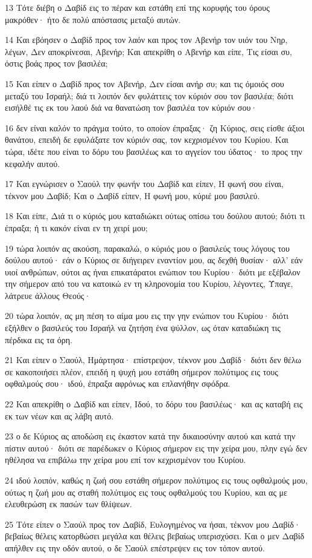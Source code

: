 \par 13 Τότε διέβη ο Δαβίδ εις το πέραν και εστάθη επί της κορυφής του όρους μακρόθεν· ήτο δε πολύ απόστασις μεταξύ αυτών.
\par 14 Και εβόησεν ο Δαβίδ προς τον λαόν και προς τον Αβενήρ τον υιόν του Νηρ, λέγων, Δεν αποκρίνεσαι, Αβενήρ; Και απεκρίθη ο Αβενήρ και είπε, Τις είσαι συ, όστις βοάς προς τον βασιλέα;
\par 15 Και είπεν ο Δαβίδ προς τον Αβενήρ, Δεν είσαι ανήρ συ; και τις όμοιός σου μεταξύ του Ισραήλ; διά τι λοιπόν δεν φυλάττεις τον κύριόν σου τον βασιλέα; διότι εισήλθέ τις εκ του λαού διά να θανατώση τον βασιλέα τον κύριόν σου·
\par 16 δεν είναι καλόν το πράγμα τούτο, το οποίον έπραξας· ζη Κύριος, σεις είσθε άξιοι θανάτου, επειδή δε εφυλάξατε τον κύριόν σας, τον κεχρισμένον του Κυρίου. Και τώρα, ιδέτε που είναι το δόρυ του βασιλέως και το αγγείον του ύδατος· το προς την κεφαλήν αυτού.
\par 17 Και εγνώρισεν ο Σαούλ την φωνήν του Δαβίδ και είπεν, Η φωνή σου είναι, τέκνον μου Δαβίδ; Και ο Δαβίδ είπεν, Η φωνή μου, κύριέ μου βασιλεύ.
\par 18 Και είπε, Διά τι ο κύριός μου καταδιώκει ούτως οπίσω του δούλου αυτού; διότι τι έπραξα; ή τι κακόν είναι εν τη χειρί μου;
\par 19 τώρα λοιπόν ας ακούση, παρακαλώ, ο κύριός μου ο βασιλεύς τους λόγους του δούλου αυτού· εάν ο Κύριος σε διήγειρεν εναντίον μου, ας δεχθή θυσίαν· αλλ' εάν υιοί ανθρώπων, ούτοι ας ήναι επικατάρατοι ενώπιον του Κυρίου· διότι με εξέβαλον την σήμερον από του να κατοικώ εν τη κληρονομία του Κυρίου, λέγοντες, Ύπαγε, λάτρευε άλλους Θεούς·
\par 20 τώρα λοιπόν, ας μη πέση το αίμα μου εις την γην ενώπιον του Κυρίου· διότι εξήλθεν ο βασιλεύς του Ισραήλ να ζητήση ένα ψύλλον, ως όταν καταδιώκη τις πέρδικα εις τα όρη.
\par 21 Και είπεν ο Σαούλ, Ημάρτησα· επίστρεψον, τέκνον μου Δαβίδ· διότι δεν θέλω σε κακοποιήσει πλέον, επειδή η ψυχή μου εστάθη σήμερον πολύτιμος εις τους οφθαλμούς σου· ιδού, έπραξα αφρόνως και επλανήθην σφόδρα.
\par 22 Και απεκρίθη ο Δαβίδ και είπεν, Ιδού, το δόρυ του βασιλέως· και ας καταβή εις εκ των νέων και ας λάβη αυτό.
\par 23 ο δε Κύριος ας αποδώση εις έκαστον κατά την δικαιοσύνην αυτού και κατά την πίστιν αυτού· διότι σε παρέδωκεν ο Κύριος σήμερον εις την χείρα μου, πλην εγώ δεν ηθέλησα να επιβάλω την χείρα μου επί τον κεχρισμένον του Κυρίου.
\par 24 ιδού λοιπόν, καθώς η ζωή σου εστάθη σήμερον πολύτιμος εις τους οφθαλμούς μου, ούτως η ζωή μου ας σταθή πολύτιμος εις τους οφθαλμούς του Κυρίου, και ας με ελευθερώση εκ πασών των θλίψεων.
\par 25 Τότε είπεν ο Σαούλ προς τον Δαβίδ, Ευλογημένος να ήσαι, τέκνον μου Δαβίδ· βεβαίως θέλεις κατορθώσει μεγάλα και θέλεις βεβαίως υπερισχύσει. Και ο μεν Δαβίδ απήλθεν εις την οδόν αυτού, ο δε Σαούλ επέστρεψεν εις τον τόπον αυτού.

